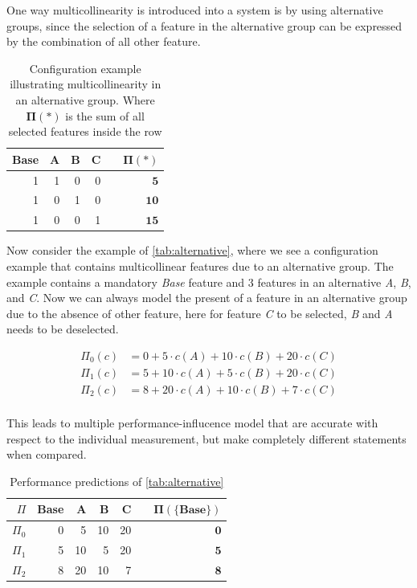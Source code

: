 One way multicollinearity is introduced into a system is by using alternative groups, since the selection of a feature in the
alternative group can be expressed by the combination of all other feature.~\cite{Multicollinearity}

\begin{table}[h]
    \centering
    \begin{tabular}{rrrrrr}
    \hline
    Base & A & B & C &  & $\bm{\Pi(*)}$ \\ \hline
    1 & 1 & 0 & 0 &  & $\mathbf{5}$  \\
    1 & 0 & 1 & 0 &  & $\mathbf{10}$  \\  
    1 & 0 & 0 & 1 &  & $\mathbf{15}$  \\\hline
    \end{tabular}  
    \caption{Configuration example illustrating multicollinearity in an alternative group.
    Where $\bm{\Pi(*)}$ is the sum of all selected features inside the row}\label{tab:alternative}
\end{table}

Now consider the example of \autoref{tab:alternative}, where we see a configuration example that contains multicollinear features due to an alternative group.
The example contains a mandatory \textit{Base} feature and 3 features in an alternative \textit{A}, \textit{B}, and \textit{C}.
Now we can always model the present of a feature in an alternative group due to the absence of other feature, here for feature \textit{C} to be selected, 
\textit{B} and \textit{A} needs to be deselected.

\begin{align*}
    \Pi_0(c) &= 0 + 5 \cdot c(A) + 10\cdot c(B) + 20\cdot c(C) \\
    \Pi_1(c) &= 5 + 10 \cdot c(A) + 5\cdot c(B) + 20\cdot c(C) \\
    \Pi_2(c) &= 8 + 20 \cdot c(A) + 10\cdot c(B) + 7\cdot c(C) \\
\end{align*}

This leads to multiple performance-influcence model that are accurate with respect to the individual measurement, 
but make completely different statements when compared.

\begin{table}[h]
    \centering
    \begin{tabular}{rrrrrrr}
    \hline
    $\Pi$ & Base & A & B & C   & &  $\bm{\Pi(\{Base\})}$   \\ \hline
    $\Pi_0$ & 0 & 5  & 10 & 20 & &  $\mathbf{0}$         \\
    $\Pi_1$ & 5 & 10 & 5  & 20 & &  $\mathbf{5}$         \\  
    $\Pi_2$ & 8 & 20 & 10 & 7  & &  $\mathbf{8}$        \\\hline
    \end{tabular}
    \caption{Performance predictions of \autoref{tab:alternative}}\label{tab:Performance-predictions}
\end{table}

